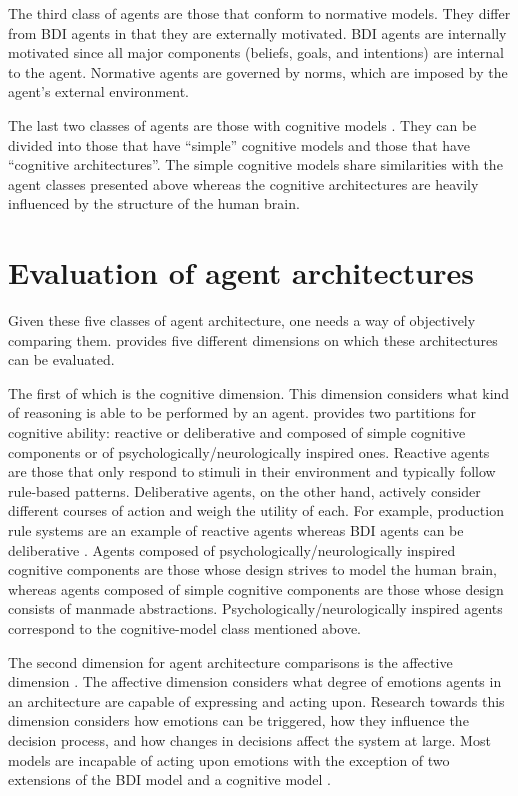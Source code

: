 The third class of agents are those that conform to normative models.
They differ from BDI agents in that they are externally motivated.
BDI agents are internally motivated since all major components (beliefs, goals, and intentions) are internal to the agent.
Normative agents are governed by norms, which are imposed by the agent's external environment.

The last two classes of agents are those with cognitive models \cite{balke_how_2014}.
They can be divided into those that have ``simple'' cognitive models and those that have ``cognitive architectures''.
The simple cognitive models share similarities with the agent classes presented above
whereas the cognitive architectures are heavily influenced by the structure of the human brain.

\section{Evaluation of agent architectures}
\label{sec:agent_evaluation}

Given these five classes of agent architecture, one needs a way of objectively comparing them.
\cite{balke_how_2014} provides five different dimensions on which these architectures can be evaluated.

The first of which is the cognitive dimension.
This dimension considers what kind of reasoning is able to be performed by an agent.
\cite{balke_how_2014} provides two partitions for cognitive ability:
reactive or deliberative and composed of simple cognitive components or of psychologically/neurologically inspired ones.
Reactive agents are those that only respond to stimuli in their environment and typically follow rule-based patterns.
Deliberative agents, on the other hand, actively consider different courses of action and weigh the utility of each.
For example, production rule systems are an example of reactive agents whereas BDI agents can be deliberative \cite{balke_how_2014}.
Agents composed of psychologically/neurologically inspired cognitive components are those whose design strives to model the human brain,
whereas agents composed of simple cognitive components are those whose design consists of manmade abstractions.
Psychologically/neurologically inspired agents correspond to the cognitive-model class mentioned above.

The second dimension for agent architecture comparisons is the affective dimension \cite{balke_how_2014}.
The affective dimension considers what degree of emotions agents in an architecture are capable of expressing and acting upon.
Research towards this dimension considers how emotions can be triggered, how they influence the decision process, and how changes in decisions affect the system at large.
Most models are incapable of acting upon emotions \cite{balke_how_2014} with the exception of two extensions of the BDI model \cite{jiang_ebdi_2007, dignum_towards_2009} and a cognitive model \cite{urban_pecs_2000}.

